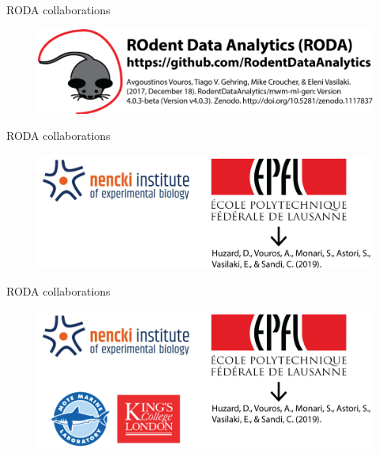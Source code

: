 \documentclass{beamer}
\begin{document}
{\begin{frame}{RODA collaborations}
	\begin{figure}[H]
		\centering
		\includegraphics[width=\textwidth]{figures/roda}
	\end{figure}
\end{frame}
\begin{frame}{RODA collaborations}
	\begin{figure}[H]
		\centering
		\includegraphics[width=\textwidth]{figures/collaborations1}
	\end{figure}		
\end{frame}
\begin{frame}{RODA collaborations}
	\begin{figure}[H]
		\centering
		\includegraphics[width=\textwidth]{figures/collaborations2}
	\end{figure}		
\end{frame}


}
\end{document}
